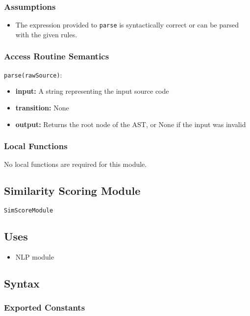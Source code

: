 \documentclass[12pt, titlepage]{article}
\begin{document}
\subsubsection{Assumptions}

\begin{itemize}
    \item The expression provided to \texttt{parse} is syntactically correct or can be parsed with the given rules.
\end{itemize}

\subsubsection{Access Routine Semantics}

\noindent \texttt{parse(rawSource)}:
\begin{itemize}
    \item \textbf{input:} A string representing the input source code
    \item \textbf{transition:} None
    \item \textbf{output:} Returns the root node of the AST, or None if the input was invalid
\end{itemize}

\subsubsection{Local Functions}
No local functions are required for this module.

\subsection{Similarity Scoring Module}

\texttt{SimScoreModule}

\subsection{Uses}

\begin{itemize}
    \item NLP module
\end{itemize}

\subsection{Syntax}

\subsubsection{Exported Constants}
\end{document}
